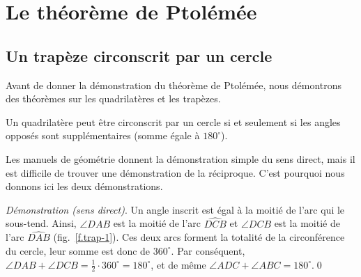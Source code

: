 
\section{Le théorème de Ptolémée}\label{a.ptolemy}



\subsection{Un trapèze circonscrit par un cercle}\label{s.circumscribed}

Avant de donner la démonstration du théorème de Ptolémée, nous démontrons des théorèmes sur les quadrilatères et les trapèzes.

\begin{theorem}\label{thm.quad-circum}
Un quadrilatère peut être circonscrit par un cercle si et seulement si les angles opposés sont supplémentaires (somme égale à $180^\circ$).
\end{theorem}

Les manuels de géométrie donnent la démonstration simple du sens direct, mais il est difficile de trouver une démonstration de la réciproque. C'est pourquoi nous donnons ici les deux démonstrations.

\noindent \emph{Démonstration (sens direct)}. 
Un angle inscrit est égal à la moitié de l'arc qui le sous-tend. Ainsi, $\angle DAB$ est la moitié de l'arc $\widehat{DCB}$ et $\angle DCB$ est la moitié de l'arc $\widehat{DAB}$ (fig.~\ref{f.trap-1}). Ces deux arcs forment la totalité de la circonférence du cercle, leur somme est donc de $360^\circ$. Par conséquent, $\angle DAB + \angle DCB = \frac{1}{2} \cdot 360^\circ = 180^\circ$, et de même $\angle ADC + \angle ABC = 180^\circ$.\qed



\vspace{0.4cm}

